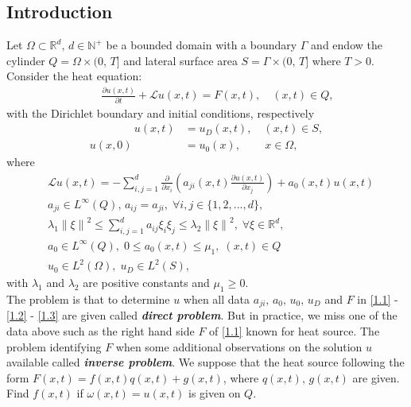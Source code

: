 \documentclass[notitlepage,a4paper,fleqn,9pt]{icmfarticle}
\begin{document}
\begin{multicols}{2}
\section{Introduction}
Let $\Omega \subset \mathbb{R}^d,\, d\in \mathbb{N^+}$ be a bounded domain with a boundary $\Gamma$ and endow the cylinder $Q=\Omega\times (0,\, T]$ and lateral surface area $S=\Gamma \times (0,\, T]$ where $T>0$. 
\\
Consider the heat equation:
\begin{align}\label{1.1}
	\qquad\frac{\partial u(x, t)}{\partial t}+\mathcal{L}u(x, t)=F(x, t), \quad(x, t)\in Q,
\end{align}
with the Dirichlet boundary and initial conditions, respectively
\begin{align}
	\qquad\qquad u(x, t)&=u_D(x, t),\quad(x, t)\in S, \label{1.2}\\
	u(x, 0)&=u_0(x),\quad\quad\, x\in \Omega,\label{1.3}
\end{align}
where
\begin{align*}
	&\mathcal{L}u(x, t) = -\sum_{i, j=1}^{d}\frac{\partial}{\partial x_i}\left(a_{ji}(x, t)\frac{\partial u(x, t)}{\partial x_j}\right)+a_0(x, t)u(x, t)\\
	&a_{ji}\in L^{\infty}(Q),\, a_{ij}=a_{ji},\; \forall i, j\in \{1, 2, ..., d\},\\
	&\lambda_1\left\|\xi\right\|^2\leq \sum_{i, j=1}^{d}a_{ij}\xi_i\xi_j\leq \lambda_2\left\|\xi\right\|^2,\; \forall \xi\in\mathbb{R}^d,\\
	&a_0\in L^{\infty}(Q),\; 0\leq a_0(x, t)\leq \mu_1,\; (x, t)\in Q\\ 
	&u_0\in L^2(\Omega),\;u_D\in L^2(S),
\end{align*}
with $\lambda_1$ and $\lambda_2$ are positive constants and $\mu_1\geq 0$.
\\
The problem is that to determine $u$ when all data $a_{ji},\,a_0,\,u_0,\,u_D$ and $F$ in \eqref{1.1} - \eqref{1.2} - \eqref{1.3} are given called \textbf{\textit{direct problem}}. But in practice, we miss one of the data above such as  the right hand side $F$ of \eqref{1.1} known for heat source. The problem identifying $F$ when some additional observations on the solution $u$ available called \textbf{\textit{inverse problem}}. We suppose that the heat source following the form $F(x, t)=f(x, t)q(x, t)+g(x, t)$, where $q(x, t),\, g(x, t)$ are given. Find $f(x, t)$ if $\omega(x, t)=u(x, t)$ is given on $Q$. 

\end{multicols}
\end{document}
